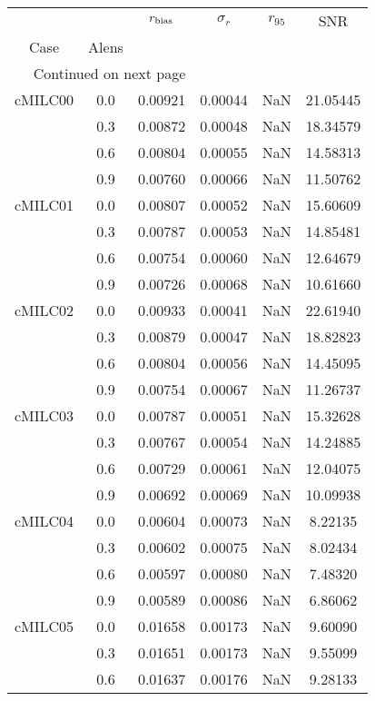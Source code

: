 \begin{longtable}{cccccc}
\toprule
        &     &  $r_{\rm bias}$  &  $\sigma_r$ &  $r_{95}$ &      SNR \\
Case & Alens &                  &             &           &          \\
\midrule
\endhead
\midrule
\multicolumn{3}{r}{{Continued on next page}} \\
\midrule
\endfoot

\bottomrule
\endlastfoot
cMILC00 & 0.0 & 0.00921 & 0.00044 & NaN & 21.05445 \\
        & 0.3 & 0.00872 & 0.00048 & NaN & 18.34579 \\
        & 0.6 & 0.00804 & 0.00055 & NaN & 14.58313 \\
        & 0.9 & 0.00760 & 0.00066 & NaN & 11.50762 \\
cMILC01 & 0.0 & 0.00807 & 0.00052 & NaN & 15.60609 \\
        & 0.3 & 0.00787 & 0.00053 & NaN & 14.85481 \\
        & 0.6 & 0.00754 & 0.00060 & NaN & 12.64679 \\
        & 0.9 & 0.00726 & 0.00068 & NaN & 10.61660 \\
cMILC02 & 0.0 & 0.00933 & 0.00041 & NaN & 22.61940 \\
        & 0.3 & 0.00879 & 0.00047 & NaN & 18.82823 \\
        & 0.6 & 0.00804 & 0.00056 & NaN & 14.45095 \\
        & 0.9 & 0.00754 & 0.00067 & NaN & 11.26737 \\
cMILC03 & 0.0 & 0.00787 & 0.00051 & NaN & 15.32628 \\
        & 0.3 & 0.00767 & 0.00054 & NaN & 14.24885 \\
        & 0.6 & 0.00729 & 0.00061 & NaN & 12.04075 \\
        & 0.9 & 0.00692 & 0.00069 & NaN & 10.09938 \\
cMILC04 & 0.0 & 0.00604 & 0.00073 & NaN & 8.22135 \\
        & 0.3 & 0.00602 & 0.00075 & NaN & 8.02434 \\
        & 0.6 & 0.00597 & 0.00080 & NaN & 7.48320 \\
        & 0.9 & 0.00589 & 0.00086 & NaN & 6.86062 \\
cMILC05 & 0.0 & 0.01658 & 0.00173 & NaN & 9.60090 \\
        & 0.3 & 0.01651 & 0.00173 & NaN & 9.55099 \\
        & 0.6 & 0.01637 & 0.00176 & NaN & 9.28133 \\

\end{longtable}
